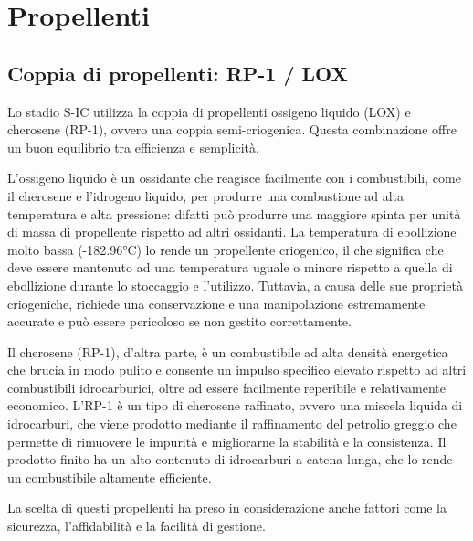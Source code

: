 \section{Propellenti}
\label{sec:propellenti}

\subsection{Coppia di propellenti: RP-1 / LOX}
\label{subsec:coppia_propellenti}

Lo stadio S-IC utilizza la coppia di propellenti ossigeno liquido (LOX) e cherosene (RP-1), ovvero una coppia semi-criogenica. Questa combinazione offre un buon equilibrio tra efficienza e semplicità.

L'ossigeno liquido è un ossidante che reagisce facilmente con i combustibili, come il cherosene e l'idrogeno liquido, per produrre una combustione ad alta temperatura e alta pressione: difatti può produrre una maggiore spinta per unità di massa di propellente rispetto ad altri ossidanti.
La temperatura di ebollizione molto bassa (-182.96°C) lo rende un propellente criogenico, il che significa che deve essere mantenuto ad una temperatura uguale o minore rispetto a quella di ebollizione durante lo stoccaggio e l'utilizzo.
Tuttavia, a causa delle sue proprietà criogeniche, richiede una conservazione e una manipolazione estremamente accurate e può essere pericoloso se non gestito correttamente.

Il cherosene (RP-1), d'altra parte, è un combustibile ad alta densità energetica che brucia in modo pulito e consente un impulso specifico elevato rispetto ad altri combustibili idrocarburici, oltre ad essere facilmente reperibile e relativamente economico.
L'RP-1 è un tipo di cherosene raffinato, ovvero una miscela liquida di idrocarburi, che viene prodotto mediante il raffinamento del petrolio greggio che permette di rimuovere le impurità e migliorarne la stabilità e la consistenza. Il prodotto finito ha un alto contenuto di idrocarburi a catena lunga, che lo rende un combustibile altamente efficiente.

La scelta di questi propellenti ha preso in considerazione anche fattori come la sicurezza, l'affidabilità e la facilità di gestione.

